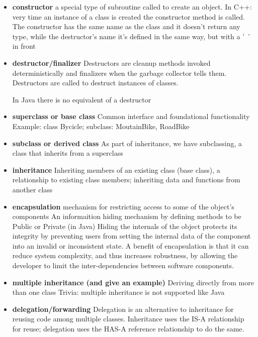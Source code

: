 \documentclass[letterpaper]{article}
\begin{document}
\begin{itemize}
\item {\bf constructor
}	a special type of subroutine called to create an object.
	In C++: very time an instance of a class is created the constructor method is called. The constructor has the same name as the class and it doesn't return any type, while the destructor's name it's defined in the same way, but with a '~' in front

\item {\bf destructor/finalizer
}	Destructors are cleanup methods invoked deterministically and finalizers
	when the garbage collector tells them. Destructors are called to destruct
	instances of classes.

	In Java there is no equivalent of a destructor 


\item {\bf superclass or base class}
	Common interface and foundational functionality
	Example: class Bycicle; subclass: MoutainBike, RoadBike

\item {\bf subclass or derived class}
	As part of inheritance, we have subclassing, a class that inherits from 
	a superclass

\item {\bf inheritance}
	Inheriting members of an existing class (base class), a relationship to 
	existing class members; inheriting data and functions from another class
	
	 \item {\bf 
encapsulation}
	mechanism for restricting access to some of the object's components
	An informaition hiding mechanism by defining methods to be Public or Private
	(in Java)
	Hiding the internals of the object protects its integrity by preventing users 
	from setting the internal data of the component into an invalid or 
	inconsistent state. A benefit of encapsulation is that it can reduce system 
	complexity, and thus increases robustness, by allowing the developer to 
	limit the inter-dependencies between software components. 
\item {\bf 
multiple inheritance (and give an example)
}	Deriving directly from more than one class
	Trivia: multiple inheritance is not supported like Java 

\item {\bf delegation/forwarding
}	Delegation is an alternative to inheritance for reusing
	code among multiple classes. Inheritance uses the
	IS-A relationship for reuse; delegation uses the HAS-A reference 
	relationship to do the same. 	


\end{itemize}
\end{document}
